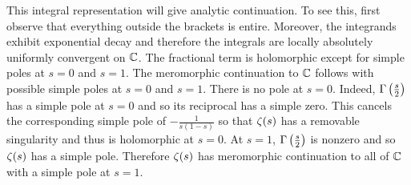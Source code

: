       This integral representation will give analytic continuation. To see this, first observe that everything outside the brackets is entire. Moreover, the integrands exhibit exponential decay and therefore the integrals are locally absolutely uniformly convergent on $\mathbb{C}$. The fractional term is holomorphic except for simple poles at $s = 0$ and $s = 1$. The meromorphic continuation to $\mathbb{C}$ follows with possible simple poles at $s = 0$ and $s = 1$. There is no pole at $s = 0$. Indeed, $\Gamma\left(\frac{s}{2}\right)$ has a simple pole at $s = 0$ and so its reciprocal has a simple zero. This cancels the corresponding simple pole of $-\frac{1}{s(1-s)}$ so that $\zeta(s)$ has a removable singularity and thus is holomorphic at $s = 0$. At $s = 1$, $\Gamma\left(\frac{s}{2}\right)$ is nonzero and so $\zeta(s)$ has a simple pole. Therefore $\zeta(s)$ has meromorphic continuation to all of $\mathbb{C}$ with a simple pole at $s = 1$.
